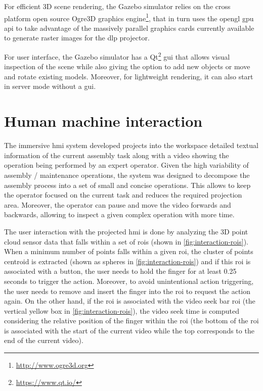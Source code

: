 For efficient 3D scene rendering, the Gazebo simulator relies on the cross platform open source Ogre3D graphics engine\footnote{\url{http://www.ogre3d.org}}, that in turn uses the \gls{opengl} \gls{gpu} \gls{api} to take advantage of the massively parallel graphics cards currently available to generate raster images for the \gls{dlp} projector.

For user interface, the Gazebo simulator has a Qt\footnote{\url{https://www.qt.io/}} \gls{gui} that allows visual inspection of the scene while also giving the option to add new objects or move and rotate existing models. Moreover, for lightweight rendering, it can also start in server mode without a \gls{gui}.



\section{Human machine interaction}\label{sec:human-machine-interaction}

The immersive \gls{hmi} system developed projects into the workspace detailed textual information of the current assembly task along with a video showing the operation being performed by an expert operator. Given the high variability of assembly / maintenance operations, the system was designed to decompose the assembly process into a set of small and concise operations. This allows to keep the operator focused on the current task and reduces the required projection area. Moreover, the operator can pause and move the video forwards and backwards, allowing to inspect a given complex operation with more time.

The user interaction with the projected \gls{hmi} is done by analyzing the 3D point cloud sensor data that falls within a set of \glspl{roi} (shown in \cref{fig:interaction-rois}). When a minimum number of points falls within a given \gls{roi}, the cluster of points centroid is extracted (shown as spheres in \cref{fig:interaction-rois}) and if this \gls{roi} is associated with a button, the user needs to hold the finger for at least 0.25 seconds to trigger the action. Moreover, to avoid unintentional action triggering, the user needs to remove and insert the finger into the \gls{roi} to request the action again. On the other hand, if the \gls{roi} is associated with the video seek bar \gls{roi} (the vertical yellow box in \cref{fig:interaction-rois}), the video seek time is computed considering the relative position of the finger within the \gls{roi} (the bottom of the \gls{roi} is associated with the start of the current video while the top corresponds to the end of the current video).

